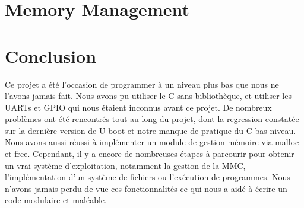 \documentclass[frenchb]{article}
\begin{document}
\section{Memory Management}

\clearpage

\section*{Conclusion}

\noindent Ce projet a été l'occasion de programmer à un niveau plus bas que nous ne l'avons jamais fait. Nous avons pu utiliser le C sans bibliothèque, et utiliser les UARTs et GPIO qui nous étaient inconnus avant ce projet.
De nombreux problèmes ont été rencontrés tout au long du projet, dont la regression constatée sur la dernière version de U-boot et notre manque de pratique du C bas niveau. 
Nous avons aussi réussi à implémenter un module de gestion mémoire via malloc et free.
Cependant, il y a encore de nombreuses étapes à parcourir pour obtenir un vrai système d'exploitation, notamment la gestion de la MMC, l'implémentation d'un système de fichiers ou l'exécution de programmes. Nous n'avons jamais perdu de vue ces fonctionnalités ce qui nous a aidé à écrire un code modulaire et maléable.
\end{document}
